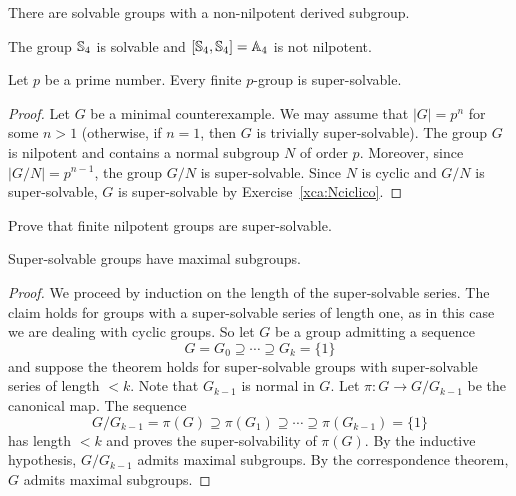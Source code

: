 There are solvable groups with a non-nilpotent derived subgroup. 

\begin{example}
The group $\mathbb{S}_4$ is solvable and $[\mathbb{S}_4,\mathbb{S}_4]=\mathbb{A}_4$ is not nilpotent.
\end{example}

\begin{proposition}
\label{pro:psuper}
Let $p$ be a prime number. Every finite $p$-group is super-solvable.
\end{proposition}

\begin{proof}
Let $G$ be a minimal counterexample. We may assume that $|G|=p^n$ for some 
$n>1$ (otherwise, if $n=1$, then $G$ is trivially super-solvable). 
The group $G$ is nilpotent and contains a normal subgroup $N$ of order $p$. 
Moreover, since $|G/N|=p^{n-1}$, the group $G/N$ is super-solvable. 
Since $N$ is cyclic and $G/N$ is super-solvable, 
$G$ is super-solvable by Exercise~\ref{xca:Nciclico}.
\end{proof}


\begin{exercise}
\label{xca:nilpotent=>supersolvable}
Prove that finite nilpotent groups are super-solvable.
\end{exercise}


\begin{theorem}
Super-solvable groups have maximal subgroups. 	
\end{theorem}

\begin{proof} 
We proceed by induction on the length of the super-solvable series. The claim holds for groups with a super-solvable series of length one, as in this case we are dealing with cyclic groups. So let 
$G$ be a group admitting a sequence
	\[
		G=G_0\supseteq\cdots\supseteq G_k=\{1\}
	\]
and suppose the theorem holds for super-solvable groups
with super-solvable series of length $<k$. Note that   
$G_{k-1}$ is normal in $G$. Let $\pi\colon G\to
	G/G_{k-1}$ be the canonical map. 
The sequence 
 	\[
		G/G_{k-1}=\pi(G)\supseteq \pi(G_1)\supseteq\cdots\supseteq\pi(G_{k-1})=\{1\}
	\]
has length 
$<k$ and proves the super-solvability of $\pi(G)$. By the inductive hypothesis, 
$G/G_{k-1}$ admits maximal subgroups. By the correspondence theorem, 
$G$ admits maximal subgroups. 
\end{proof}

